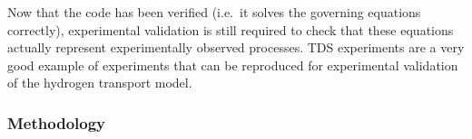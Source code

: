 Now that the code has been verified (i.e.\ it solves the governing equations correctly), experimental validation is still required to check that these equations actually represent experimentally observed processes.
TDS experiments are a very good example of experiments that can be reproduced for experimental validation of the hydrogen transport model.

\subsubsection{Methodology} 


